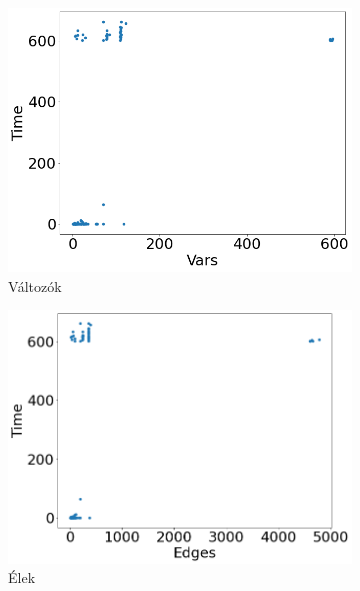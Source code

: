 \begin{figure}[ht] 
	\begin{subfigure}[b]{0.5\linewidth}
		\centering
		\includegraphics[width=0.95\linewidth]{figures/plc/vars.png} 
		\caption{Változók} 
		\label{fig7:a} 
		\vspace{4ex}
	\end{subfigure}%
	\begin{subfigure}[b]{0.5\linewidth}
		\centering
		\includegraphics[width=0.95\linewidth]{figures/plc/edges.png} 
		\caption{Élek} 
		\label{fig7:b} 
		\vspace{4ex}
	\end{subfigure} 
	\begin{subfigure}[b]{0.5\linewidth}
		\centering

\end{subfigure}
\end{figure}
